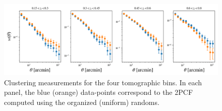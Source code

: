 \documentclass[fleqn,usenatbib,useAMS]{mnras}
\begin{document}
\begin{figure}
\includegraphics[width=\textwidth]{figures_tmp/xi.png}
\caption{\label{fig:xi} Clustering measurements for the four tomographic bins. In each panel, the blue (orange) data-points correspond to the 2PCF computed using the organized (uniform) randoms.} 
\end{figure}









\appendix


\bsp	%
\label{lastpage}
\end{document}
